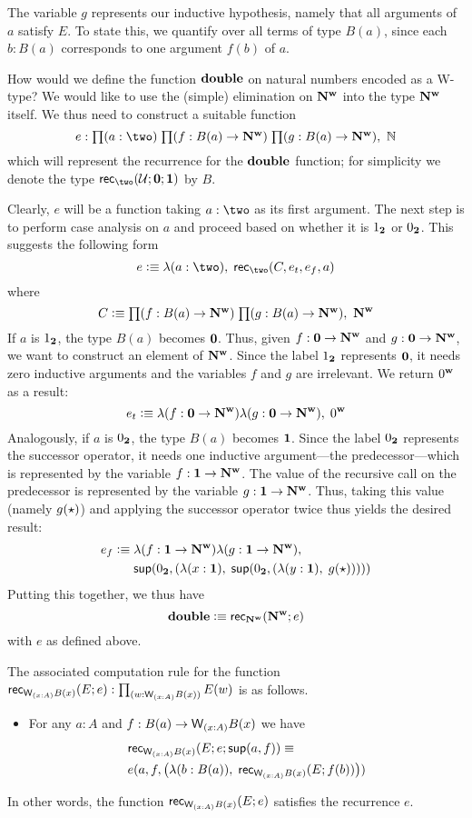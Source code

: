 The variable $g$ represents our inductive hypothesis, namely that all arguments of $a$ satisfy $E$. To state this, we quantify over all terms of type $B(a)$, since each $b : B(a)$ corresponds to one argument $f(b)$ of $a$.

How would we define the function $\mathbf{double}$ on natural numbers encoded as a W-type? We would like to use the (simple) elimination on $\mathbf{N^w}$ into the type $\mathbf{N^w}$ itself. We thus need to construct a suitable function
\[e : \prd{a : \two}{f : B(a) \to \natw}{g : B(a) \to \natw} \nat\]
which will represent the recurrence for the $\mathbf{double}$ function; for simplicity we denote the type $\rec\two(\bbU;\zero;\one)$ by $B$.

Clearly, $e$ will be a function taking $a : \two$ as its first argument. The next step is to perform case analysis on $a$ and proceed based on whether it is $1_{\mathbf{2}}$ or $0_{\mathbf{2}}$. This suggests the following form
\[ e \defeq \lambda(a : \two), \; \rec\two(C,e_t,e_f,a) \]
where \[C \defeq \prd{f : B(a) \to \natw}{g : B(a) \to \natw} \natw\]
If $a$ is $1_{\mathbf{2}}$, the type $B(a)$ becomes $\mathbf{0}$. Thus, given $f : \mathbf{0} \to \mathbf{N^w}$ and $g : \mathbf{0} \to \mathbf{N^w}$, we want to construct an element of $\mathbf{N^w}$. Since the label $1_{\mathbf{2}}$ represents $\mathbf{0}$, it needs zero inductive arguments and the variables $f$ and $g$ are irrelevant. We return $0^\mathbf{w}$ as a result:
\[ e_t \vcentcolon\equiv \lambda(f:\mathbf{0} \to \mathbf{N^w})\lambda(g:\mathbf{0} \to \mathbf{N^w}), \; 0^\mathbf{w} \]
Analogously, if $a$ is $0_{\mathbf{2}}$, the type $B(a)$ becomes $\mathbf{1}$.
Since the label $0_{\mathbf{2}}$ represents the successor operator, it needs one inductive argument---the predecessor---which is represented by the variable $f : \mathbf{1} \to \mathbf{N^w}$.
The value of the recursive call on the predecessor is represented by the variable $g : \mathbf{1} \to \mathbf{N^w}$.
Thus, taking this value (namely $g(\star)$) and applying the successor operator twice thus yields the desired result:
\begin{align*}
 e_f \vcentcolon\equiv & \; \lambda(f:\mathbf{1} \to \mathbf{N^w})\lambda(g:\mathbf{1} \to \mathbf{N^w}), \\
  & \; \mathsf{sup}(0_{\mathbf{2}}, (\lambda (x:\mathbf{1}), \; \mathsf{sup}(0_{\mathbf{2}}, (\lambda (y : \mathbf{1}), \; g(\star)))))
\end{align*}
Putting this together, we thus have
\[ \mathbf{double} \vcentcolon\equiv \mathsf{rec}_{\mathbf{N^w}}(\mathbf{N^w}; e) \]
with $e$ as defined above.

The associated computation rule for the function $\rec{\wtype{x:A} B(x)}(E;e) : \prd{w : \wtype{x:A} B(x)} E(w)$ is as follows.
\begin{itemize}
\item For any $a : A$ and $f : B(a) \to \wtype{x:A} B(x)$ we have 
\begin{align*}
& \rec{\wtype{x:A} B(x)}(E;e;\supp(a,f)) \equiv \\ & e(a,f,\big(\lambda (b : B(a)), \; \rec{\wtype{x:A} B(x)}(E;f(b))\big))
\end{align*}
\end{itemize}
In other words, the function $\rec{\wtype{x:A} B(x)}(E;e)$ satisfies the recurrence $e$.

